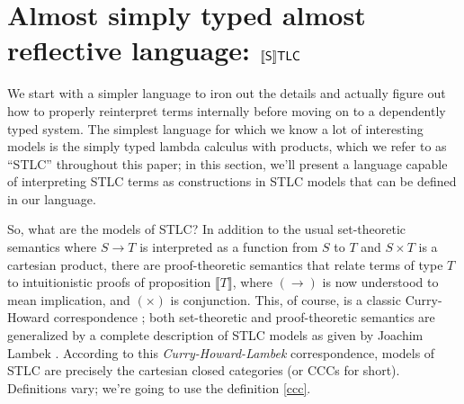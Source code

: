 \section{
    Almost simply typed almost reflective language:
    \texorpdfstring{$\llbracket\mathsf{S}\rrbracket\mathsf{TLC}$}{[[S]]TLC}
}\label{SSTLC}

We start with a simpler language to iron out the details
and actually figure out how to properly reinterpret
terms internally before moving on to a dependently typed
system. The simplest language for which we know a lot of
interesting models is the simply typed lambda calculus
with products, which we refer to as ``STLC'' throughout
this paper; in this section, we'll present a language
capable of interpreting STLC terms as constructions in
STLC models that can be defined in our language.

So, what are the models of STLC? In addition to the
usual set-theoretic semantics where $S\to T$ is
interpreted as a function from $S$ to $T$ and
$S\times T$ is a cartesian product, there are
proof-theoretic semantics that relate terms of type $T$
to intuitionistic proofs of proposition
$\llbracket T\rrbracket$, where $(\to)$ is now
understood to mean implication, and $(\times)$ is
conjunction. This, of course, is a classic Curry-Howard
correspondence \cite{ho80}; both set-theoretic and
proof-theoretic semantics are generalized by a complete
description of STLC models as given by Joachim Lambek
\cite{Lambek1980}. According to this
\textit{Curry-Howard-Lambek} correspondence, models
of STLC are precisely the cartesian closed categories
(or CCCs for short). Definitions vary; we're going to
use the definition \ref{ccc}.

